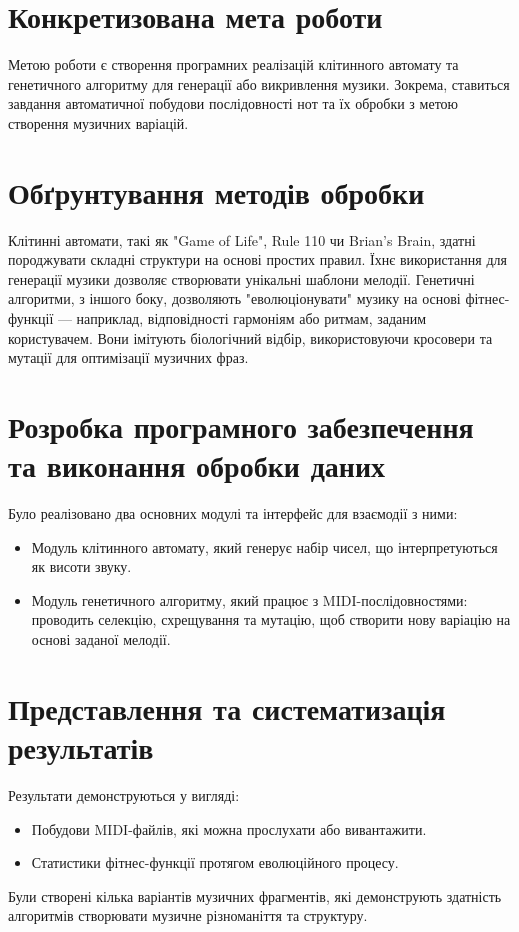 \documentclass{article}
\begin{document}
    \section{Конкретизована мета роботи}
    Метою роботи є створення програмних реалізацій клітинного автомату та генетичного алгоритму для генерації або викривлення музики. Зокрема, ставиться завдання автоматичної побудови послідовності нот та їх обробки з метою створення музичних варіацій.

    \section{Обґрунтування методів обробки}
    Клітинні автомати, такі як "Game of Life", Rule 110 чи Brian's Brain, здатні породжувати складні структури на основі простих правил. Їхнє використання для генерації музики дозволяє створювати унікальні шаблони мелодії.  
    Генетичні алгоритми, з іншого боку, дозволяють "еволюціонувати" музику на основі фітнес-функції — наприклад, відповідності гармоніям або ритмам, заданим користувачем. Вони імітують біологічний відбір, використовуючи кросовери та мутації для оптимізації музичних фраз.

    \section{Розробка програмного забезпечення та виконання обробки даних}
        Було реалізовано два основних модулі та інтерфейс для взаємодії з ними:
        \begin{itemize}
            \item Модуль клітинного автомату, який генерує набір чисел, що інтерпретуються як висоти звуку.
            \item Модуль генетичного алгоритму, який працює з MIDI-послідовностями: проводить селекцію, схрещування та мутацію, щоб створити нову варіацію на основі заданої мелодії.
        \end{itemize}

    \section{Представлення та систематизація результатів}
        Результати демонструються у вигляді:
        \begin{itemize}
            \item Побудови MIDI-файлів, які можна прослухати або вивантажити.
            \item Статистики фітнес-функції протягом еволюційного процесу.
        \end{itemize}
        Були створені кілька варіантів музичних фрагментів, які демонструють здатність алгоритмів створювати музичне різноманіття та структуру.
    
\end{document}
